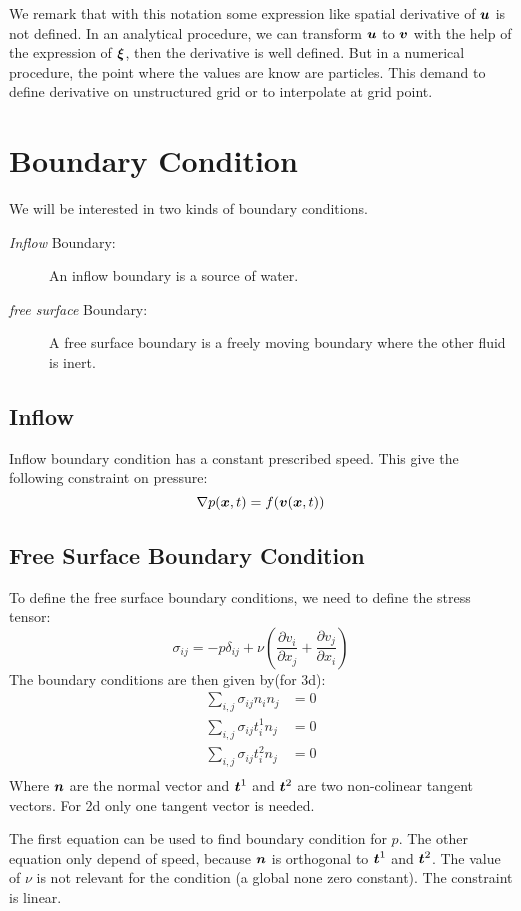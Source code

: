\begin{remark}
We remark that with this notation some expression like spatial derivative of ${\boldsymbol {u}}$ is not defined.
In an analytical procedure, we can transform ${\boldsymbol {u}}$ to ${\boldsymbol {v}}$ with the help of the expression of ${\boldsymbol {\xi}}$, then the derivative is well defined.
But in a numerical procedure, the point where the values are know are particles. This demand to define derivative on unstructured grid
or to interpolate at grid point.
\end{remark}

\section{Boundary Condition}

We will be interested in two kinds of boundary conditions.
\begin{description}
 \item[\emph{Inflow} Boundary:]
 An inflow boundary is a source of water.
 \item[\emph{free surface} Boundary:]
 A free surface boundary is a freely moving boundary where the other fluid is inert.
\end{description}

\subsection{Inflow}

Inflow boundary condition has a constant prescribed speed.
This give the following constraint on pressure:
\begin{equation}
\nabla p({\boldsymbol {x}},t)=f({\boldsymbol {v}}({\boldsymbol {x}},t))
\end{equation}

\subsection{Free Surface Boundary Condition}
\label{ana:free:surface}
To define the free surface boundary conditions, we need to define the stress tensor:
\begin{equation}
	\sigma_{ij}=-p \delta_{ij}+\nu\left(\frac{\partial v_{i}}{\partial x_{j}}+\frac{\partial v_{j}}{\partial x_{i}}\right)
\end{equation}
The boundary conditions are then given by(for 3d):
\begin{align}
	\sum_{i,j}\sigma_{ij}n_{i}n_{j}&=0\\
	\sum_{i,j}\sigma_{ij}t^{1}_{i}n_{j}&=0\\
	\sum_{i,j}\sigma_{ij}t^{2}_{i}n_{j}&=0\\
\end{align}
Where ${\boldsymbol {n}}$ are the normal vector and ${\boldsymbol {t}}^1$ and ${\boldsymbol {t}}^2$ are two non-colinear tangent vectors.
For 2d only one tangent vector is needed.

The first equation can be used to find boundary condition for $p$.
The other equation only depend of speed, because ${\boldsymbol {n}}$ is orthogonal to ${\boldsymbol {t}}^{1}$ and ${\boldsymbol {t}}^{2}$.
The value of $\nu$ is not relevant for the condition (a global none zero constant).
The constraint is linear.